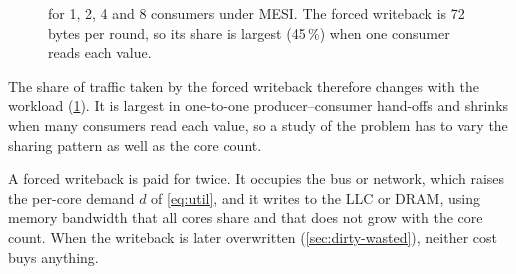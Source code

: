 \begin{figure}[htbp]
\centering
{}
\caption[Forced writeback traffic in producer--consumer sharing]{
for 1, 2, 4 and 8 consumers under MESI. The forced writeback is 72 bytes per round,
so its share is largest (45\,\%) when one consumer reads each value.}
\label{fig:pc-model}
\end{figure}

The share of traffic taken by the forced writeback therefore changes with the
workload (\cref{fig:pc-model}). It is largest in one-to-one producer--consumer
hand-offs and shrinks when many consumers read each value, so a study of the
problem has to vary the sharing pattern as well as the core count.

\label{sec:dirty-memory}
A forced writeback is paid for twice. It occupies the bus or network, which raises
the per-core demand $d$ of \cref{eq:util}, and it writes to the LLC or DRAM, using
memory bandwidth that all cores share and that does not grow with the core count.
When the writeback is later overwritten (\cref{sec:dirty-wasted}), neither cost
buys anything.
